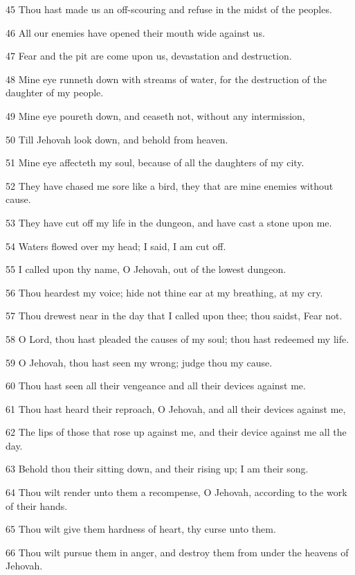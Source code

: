 \par 45 Thou hast made us an off-scouring and refuse in the midst of the peoples.
\par 46 All our enemies have opened their mouth wide against us.
\par 47 Fear and the pit are come upon us, devastation and destruction.
\par 48 Mine eye runneth down with streams of water, for the destruction of the daughter of my people.
\par 49 Mine eye poureth down, and ceaseth not, without any intermission,
\par 50 Till Jehovah look down, and behold from heaven.
\par 51 Mine eye affecteth my soul, because of all the daughters of my city.
\par 52 They have chased me sore like a bird, they that are mine enemies without cause.
\par 53 They have cut off my life in the dungeon, and have cast a stone upon me.
\par 54 Waters flowed over my head; I said, I am cut off.
\par 55 I called upon thy name, O Jehovah, out of the lowest dungeon.
\par 56 Thou heardest my voice; hide not thine ear at my breathing, at my cry.
\par 57 Thou drewest near in the day that I called upon thee; thou saidst, Fear not.
\par 58 O Lord, thou hast pleaded the causes of my soul; thou hast redeemed my life.
\par 59 O Jehovah, thou hast seen my wrong; judge thou my cause.
\par 60 Thou hast seen all their vengeance and all their devices against me.
\par 61 Thou hast heard their reproach, O Jehovah, and all their devices against me,
\par 62 The lips of those that rose up against me, and their device against me all the day.
\par 63 Behold thou their sitting down, and their rising up; I am their song.
\par 64 Thou wilt render unto them a recompense, O Jehovah, according to the work of their hands.
\par 65 Thou wilt give them hardness of heart, thy curse unto them.
\par 66 Thou wilt pursue them in anger, and destroy them from under the heavens of Jehovah.

